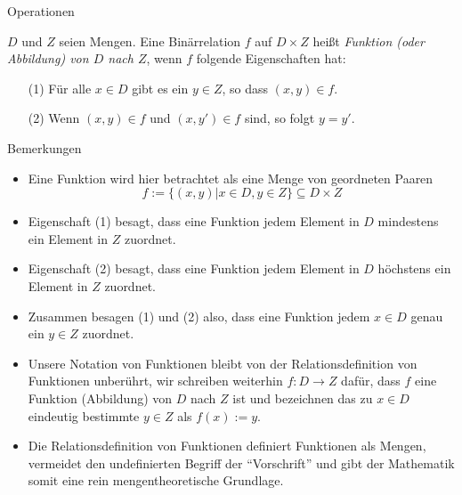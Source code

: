 \documentclass[
  8pt,
  ignorenonframetext,
]{beamer}
\providecommand{\tightlist}{%
  \setlength{\itemsep}{0pt}\setlength{\parskip}{0pt}}
\begin{document}
\begin{frame}{Operationen}
\protect\hypertarget{operationen}{}
\small
\begin{definition}
\justifying
$D$ und $Z$ seien Mengen. Eine Binärrelation $f$ auf $D \times Z$ heißt \textit{Funktion
(oder Abbildung) von $D$ nach $Z$}, wenn $f$ folgende Eigenschaften hat:
\begin{enumerate}
\item[(1)] Für alle $x \in D$ gibt es ein $y \in Z$, so dass $(x,y) \in f$.
\item[(2)] Wenn $(x,y)\in f$ und $(x,y') \in f$ sind, so folgt $y = y'$.
\end{enumerate}
\end{definition}
\footnotesize

Bemerkungen

\begin{itemize}
\tightlist
\item
  \justifying Eine Funktion wird hier betrachtet als eine Menge von
  geordneten Paaren \begin{equation}
  f := \{(x,y)|x\in D, y\in Z\} \subseteq D \times Z
  \end{equation}
\item
  Eigenschaft (1) besagt, dass eine Funktion jedem Element in \(D\)
  mindestens ein Element in \(Z\) zuordnet.
\item
  Eigenschaft (2) besagt, dass eine Funktion jedem Element in \(D\)
  höchstens ein Element in \(Z\) zuordnet.
\item
  Zusammen besagen (1) und (2) also, dass eine Funktion jedem
  \(x \in D\) genau ein \(y \in Z\) zuordnet.
\item
  Unsere Notation von Funktionen bleibt von der Relationsdefinition von
  Funktionen unberührt, wir schreiben weiterhin \(f : D \to Z\) dafür,
  dass \(f\) eine Funktion (Abbildung) von \(D\) nach \(Z\) ist und
  bezeichnen das zu \(x \in D\) eindeutig bestimmte \(y \in Z\) als
  \(f(x):=y\).
\item
  Die Relationsdefinition von Funktionen definiert Funktionen als
  Mengen, vermeidet den undefinierten Begriff der ``Vorschrift'' und
  gibt der Mathematik somit eine rein mengentheoretische Grundlage.
\end{itemize}
\end{frame}
\end{document}
